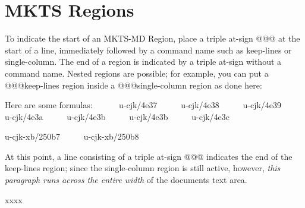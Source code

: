 \section{MKTS Regions 
}


To indicate the start of an MKTS-MD Region, place a triple at-sign {\mktsFontfileSourcecodeproregular{}@@@}
at the start of a line, immediately followed by a command name such as
{\mktsFontfileSourcecodeproregular{}keep-lines} or {\mktsFontfileSourcecodeproregular{}single-column}. The end of a region is indicated by a
triple at-sign without a command name. Nested regions are possible; for example,
\null\newpage{}you can put a {\mktsFontfileSourcecodeproregular{}@@@keep-lines} region inside a {\mktsFontfileSourcecodeproregular{}@@@single-column} region as
done here:\par

Here are some formulas:
\begingroup{}     
{\mktsFontfileSourcecodeproregular{}u-cjk/4e37}     
{\mktsFontfileSourcecodeproregular{}u-cjk/4e38}     
{\mktsFontfileSourcecodeproregular{}u-cjk/4e39}     
{\mktsFontfileSourcecodeproregular{}u-cjk/4e3a}     
{\mktsFontfileSourcecodeproregular{}u-cjk/4e3b}     
{\mktsFontfileSourcecodeproregular{}u-cjk/4e3b}     
{\mktsFontfileSourcecodeproregular{}u-cjk/4e3c}     \par

{\mktsFontfileSourcecodeproregular{}u-cjk-xb/250b7}     
{\mktsFontfileSourcecodeproregular{}u-cjk-xb/250b8}     \par

\endgroup{}\par

At this point, a line consisting of a triple at-sign {\mktsFontfileSourcecodeproregular{}@@@}
indicates the end of the {\mktsFontfileSourcecodeproregular{}keep-lines} region; since the
{\mktsFontfileSourcecodeproregular{}single-column} region is still active, however, \textit{this
paragraph runs across the entire width} of the documents text
area.\par

xxxx\par

\par
